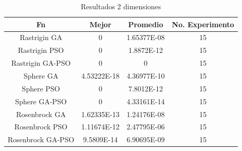 \documentclass[runningheads]{llncs}
\begin{document}
\begin{table}[htp]
    \caption{Resultados 2 dimensiones}
    \label{table:resultados-2}
    \centering
    \begin{tabular}{|c|c|c|c|}
    \hline
    Fn & Mejor & Promedio & No. Experimento \\
    \hline
    \hline
    Rastrigin GA & 0 & 1.65377E-08 & 15\\
    \hline
    Rastrigin PSO & 0 & 1.8872E-12 & 15\\
    \hline
    Rastrigin GA-PSO & 0 & 0 & 15\\
    \hline
    Sphere GA & 4.53222E-18 & 4.36977E-10 & 15\\
    \hline
    Sphere PSO & 0 & 7.8012E-12 & 15\\
    \hline
    Sphere GA-PSO & 0 & 4.33161E-14 & 15\\
    \hline
    Rosenbrock GA & 1.62335E-13 & 1.24176E-08 & 15\\
    \hline
    Rosenbrock PSO & 1.11674E-12 & 2.47795E-06 & 15\\
    \hline
    Rosenbrock GA-PSO & 9.5809E-14 & 6.90695E-09 & 15\\
    \hline
    \end{tabular}
    \end{table}
  
\end{document}
